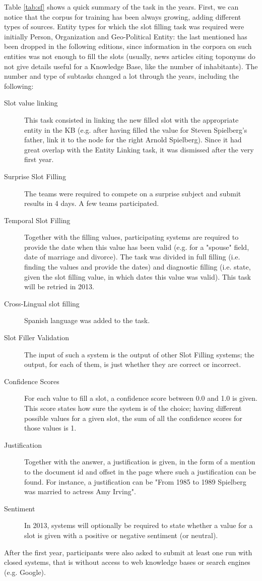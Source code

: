 \documentclass[a4paper,11pt]{report}
\begin{document}
Table \ref{tab:sf} shows a quick summary of the task in the years. First, we can notice that the corpus for training has been always growing, adding different types of sources. Entity types for which the slot filling task was required were initially Person, Organization and Geo-Political Entity: the last mentioned has been dropped in the following editions, since information in the corpora on such entities was not enough to fill the slots (usually, news articles citing toponyms do not give details useful for a Knowledge Base, like the number of inhabitants).
The number and type of subtasks changed a lot through the years, including the following:
\begin{description}
\item[Slot value linking] This task consisted in linking the new filled slot with the appropriate entity in the KB (e.g. after having filled the value for Steven Spielberg's father, link it to the node for the right Arnold Spielberg). Since it had great overlap with the Entity Linking task, it was dismissed after the very first year.
\item[Surprise Slot Filling] The teams were required to compete on a surprise subject and submit results in 4 days. A few teams participated.
\item[Temporal Slot Filling] Together with the filling values, participating systems are required to provide the date when this value has been valid (e.g. for a "spouse" field, date of marriage and divorce). The task was divided in full filling (i.e. finding the values and provide the dates) and diagnostic filling (i.e. state, given the slot filling value, in which dates this value was valid). This task will be retried in 2013.
\item[Cross-Lingual slot filling] Spanish language was added to the task.
\item[Slot Filler Validation] The input of such a system is the output of other Slot Filling systems; the output, for each of them, is just whether they are correct or incorrect.
\item[Confidence Scores] For each value to fill a slot, a confidence score between 0.0 and 1.0 is given. This score states how sure the system is of the choice; having different possible values for a given slot, the sum of all the confidence scores for those values is 1.
\item[Justification] Together with the answer, a justification is given, in the form of a mention to the document id and offset in the page where such a justification can be found. For instance, a justification can be "From 1985 to 1989 Spielberg was married to actress Amy Irving".
\item[Sentiment] In 2013, systems will optionally be required to state whether a value for a slot is given with a positive or negative sentiment (or neutral).
\end{description}
After the first year, participants were also asked to submit at least one run with closed systems, that is without access to web knowledge bases or search engines (e.g. Google).
\end{document}
